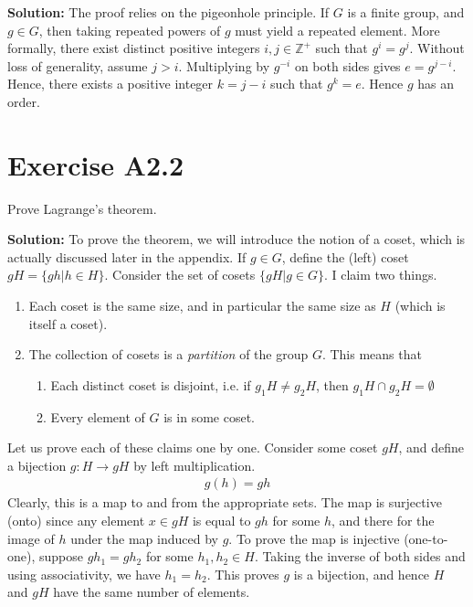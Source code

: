 \documentclass{book}
\begin{document}
    \textbf{Solution:} The proof relies on the pigeonhole principle. If $G$ is a finite group, and $g\in G$, then taking repeated powers of $g$ must yield a repeated element. More formally, there exist distinct positive integers $i,j \in \mathbb{Z^+}$ such that $g^i = g^j$. Without loss of generality, assume $j>i$. Multiplying by $g^{-i}$ on both sides gives $e = g^{j-i}$. Hence, there exists a positive integer $k=j-i$ such that $g^k = e$. Hence $g$ has an order. 
    
\section*{Exercise A2.2}
    Prove Lagrange's theorem.
    
    \textbf{Solution:} To prove the theorem, we will introduce the notion of a coset, which is actually discussed later in the appendix. If $g\in G$, define the (left) coset $gH = \{gh|h\in H\}$. Consider the set of cosets $\{gH| g\in G\}$. I claim two things.
    \begin{enumerate}
        \item Each coset is the same size, and in particular the same size as $H$ (which is itself a coset).
        \item The collection of cosets is a \emph{partition} of the group $G$. This means that
        \begin{enumerate}
            \item Each distinct coset is disjoint, i.e. if $g_1 H \neq g_2 H$, then $g_1 H \cap g_2 H = \emptyset$
            \item Every element of $G$ is in some coset.
        \end{enumerate}
    \end{enumerate}
    Let us prove each of these claims one by one. Consider some coset $gH$, and define a bijection $g:H\rightarrow gH$ by left multiplication.
    \begin{align}
        g(h) = gh
    \end{align}
    Clearly, this is a map to and from the appropriate sets. The map is surjective (onto) since any element $x\in gH$ is equal to $gh$ for some $h$, and there for the image of $h$ under the map induced by $g$. To prove the map is injective (one-to-one), suppose $gh_1 = gh_2$ for some $h_1, h_2 \in H$. Taking the inverse of both sides and using associativity, we have $h_1 = h_2$. This proves $g$ is a bijection, and hence $H$ and $gH$ have the same number of elements. 
    
\end{document}
